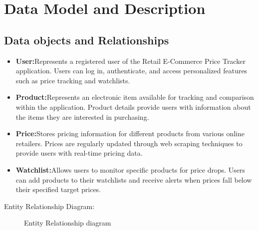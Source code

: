 \documentclass[a4paper,14pt,onecolumn]{report}
\begin{document}
	\section{Data Model and Description}  
	\subsection{Data objects and Relationships}
	\begin{itemize}
		\item \textbf{User:}Represents a registered user of the Retail E-Commerce Price Tracker application. Users can log in, authenticate, and access personalized features such as price tracking and watchlists.
		\item \textbf{Product:}Represents an electronic item available for tracking and comparison within the application. Product details provide users with information about the items they are interested in purchasing.
		\item \textbf{Price:}Stores pricing information for different products from various online retailers. Prices are regularly updated through web scraping techniques to provide users with real-time pricing data.
		\item \textbf{Watchlist:}Allows users to monitor specific products for price drops. Users can add products to their watchlists and receive alerts when prices fall below their specified target prices.
	\end{itemize}
	\clearpage
	Entity Relationship Diagram:
	\begin{center}
		\begin{figure}[!htbp]
			\centering
			\caption{Entity Relationship diagram}
			\label{fig:EntityRelationDiagram}
		\end{figure}
	\end{center} 
	
\end{document}

